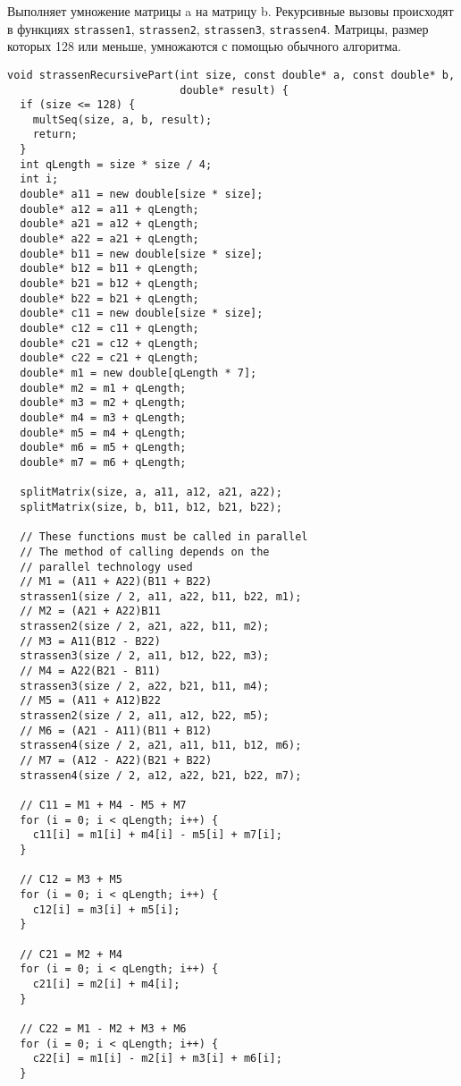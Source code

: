 \documentclass{report}
\begin{document}
\begin{enumerate}
\par Выполняет умножение матрицы a на матрицу b. Рекурсивные вызовы происходят в функциях \lstinline{strassen1}, \lstinline{strassen2}, \lstinline{strassen3}, \lstinline{strassen4}. Матрицы, размер которых 128 или меньше, умножаются с помощью обычного алгоритма.
\begin{lstlisting}
void strassenRecursivePart(int size, const double* a, const double* b,
                           double* result) {
  if (size <= 128) {
    multSeq(size, a, b, result);
    return;
  }
  int qLength = size * size / 4;
  int i;
  double* a11 = new double[size * size];
  double* a12 = a11 + qLength;
  double* a21 = a12 + qLength;
  double* a22 = a21 + qLength;
  double* b11 = new double[size * size];
  double* b12 = b11 + qLength;
  double* b21 = b12 + qLength;
  double* b22 = b21 + qLength;
  double* c11 = new double[size * size];
  double* c12 = c11 + qLength;
  double* c21 = c12 + qLength;
  double* c22 = c21 + qLength;
  double* m1 = new double[qLength * 7];
  double* m2 = m1 + qLength;
  double* m3 = m2 + qLength;
  double* m4 = m3 + qLength;
  double* m5 = m4 + qLength;
  double* m6 = m5 + qLength;
  double* m7 = m6 + qLength;

  splitMatrix(size, a, a11, a12, a21, a22);
  splitMatrix(size, b, b11, b12, b21, b22);

  // These functions must be called in parallel
  // The method of calling depends on the
  // parallel technology used
  // M1 = (A11 + A22)(B11 + B22)
  strassen1(size / 2, a11, a22, b11, b22, m1);
  // M2 = (A21 + A22)B11
  strassen2(size / 2, a21, a22, b11, m2);
  // M3 = A11(B12 - B22)
  strassen3(size / 2, a11, b12, b22, m3);
  // M4 = A22(B21 - B11)
  strassen3(size / 2, a22, b21, b11, m4);
  // M5 = (A11 + A12)B22
  strassen2(size / 2, a11, a12, b22, m5);
  // M6 = (A21 - A11)(B11 + B12)
  strassen4(size / 2, a21, a11, b11, b12, m6);
  // M7 = (A12 - A22)(B21 + B22)
  strassen4(size / 2, a12, a22, b21, b22, m7);

  // C11 = M1 + M4 - M5 + M7
  for (i = 0; i < qLength; i++) {
    c11[i] = m1[i] + m4[i] - m5[i] + m7[i];
  }

  // C12 = M3 + M5
  for (i = 0; i < qLength; i++) {
    c12[i] = m3[i] + m5[i];
  }

  // C21 = M2 + M4
  for (i = 0; i < qLength; i++) {
    c21[i] = m2[i] + m4[i];
  }

  // C22 = M1 - M2 + M3 + M6
  for (i = 0; i < qLength; i++) {
    c22[i] = m1[i] - m2[i] + m3[i] + m6[i];
  }


\end{lstlisting}
\end{enumerate}
\end{document}
